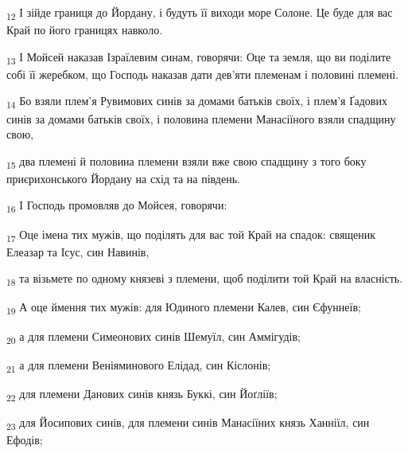 \begin{tcolorbox}
\textsubscript{12} І зійде границя до Йордану, і будуть її виходи море Солоне. Це буде для вас Край по його границях навколо.
\end{tcolorbox}
\begin{tcolorbox}
\textsubscript{13} І Мойсей наказав Ізраїлевим синам, говорячи: Оце та земля, що ви поділите собі її жеребком, що Господь наказав дати дев'яти племенам і половині племені.
\end{tcolorbox}
\begin{tcolorbox}
\textsubscript{14} Бо взяли плем'я Рувимових синів за домами батьків своїх, і плем'я Ґадових синів за домами батьків своїх, і половина племени Манасіїного взяли спадщину свою,
\end{tcolorbox}
\begin{tcolorbox}
\textsubscript{15} два племені й половина племени взяли вже свою спадщину з того боку приєрихонського Йордану на схід та на південь.
\end{tcolorbox}
\begin{tcolorbox}
\textsubscript{16} І Господь промовляв до Мойсея, говорячи:
\end{tcolorbox}
\begin{tcolorbox}
\textsubscript{17} Оце імена тих мужів, що поділять для вас той Край на спадок: священик Елеазар та Ісус, син Навинів,
\end{tcolorbox}
\begin{tcolorbox}
\textsubscript{18} та візьмете по одному князеві з племени, щоб поділити той Край на власність.
\end{tcolorbox}
\begin{tcolorbox}
\textsubscript{19} А оце ймення тих мужів: для Юдиного племени Калев, син Єфуннеїв;
\end{tcolorbox}
\begin{tcolorbox}
\textsubscript{20} а для племени Симеонових синів Шемуїл, син Аммігудів;
\end{tcolorbox}
\begin{tcolorbox}
\textsubscript{21} а для племени Веніяминового Елідад, син Кіслонів;
\end{tcolorbox}
\begin{tcolorbox}
\textsubscript{22} для племени Данових синів князь Буккі, син Йоґліїв;
\end{tcolorbox}
\begin{tcolorbox}
\textsubscript{23} для Йосипових синів, для племени синів Манасіїних князь Ханніїл, син Ефодів;
\end{tcolorbox}
